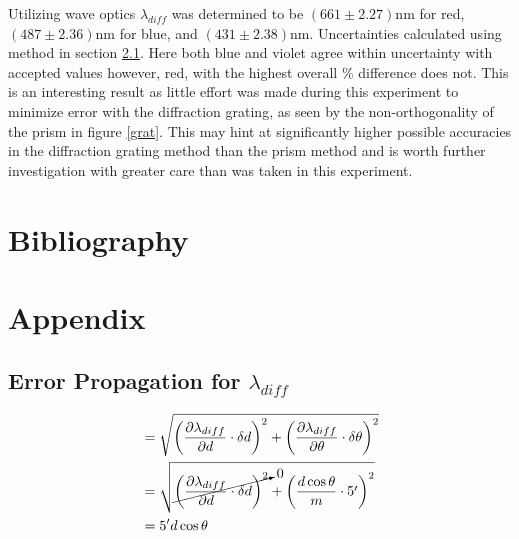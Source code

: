 \documentclass[10pt, twocolumn]{article}
\theoremstyle{definition}
\begin{document}
Utilizing wave optics $\lambda_{diff}$ was determined to be $(661 \pm 2.27)\unit{\nano\meter}$ for red, $(487\pm2.36)\unit{\nano\meter}$ for blue, and $(431\pm2.38)\unit{\nano\meter}$.
Uncertainties calculated using method in section \ref{epropdiff}. Here both blue and violet agree within uncertainty with accepted values however, red, with the highest
overall \% difference does not. This is an interesting result as little effort was made during this experiment to minimize error with the diffraction grating,
as seen by the non-orthogonality of the prism in figure \ref{grat}. This may hint at significantly higher possible accuracies in the diffraction grating method than
the prism method and is worth further investigation with greater care than was taken in this experiment.
\section{Bibliography}
{}


\section{Appendix}
\subsection{Error Propagation for $\lambda_{diff}$} \label{epropdiff}
\begin{align*}
   & =\sqrt{\left(\frac{\partial \lambda_{diff}}{\partial d}\cdot\delta d\right)^2+\left(\frac{\partial \lambda_{diff}}{\partial \theta}\cdot\delta \theta\right)^2} \\
   & =\sqrt{\cancelto{0}{\left(\frac{\partial \lambda_{diff}}{\partial d}\cdot\delta d\right)^2}+\left(\frac{d\cos\theta}{m}\cdot\qty{5}{\arcminute}\right)^2}       \\
   & =\qty{5}{\arcminute}d\cos\theta                                                                                                                                 \\
\end{align*}
\end{document}
